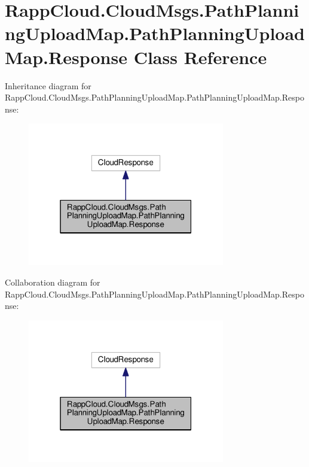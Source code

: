 \hypertarget{classRappCloud_1_1CloudMsgs_1_1PathPlanningUploadMap_1_1PathPlanningUploadMap_1_1Response}{\section{Rapp\-Cloud.\-Cloud\-Msgs.\-Path\-Planning\-Upload\-Map.\-Path\-Planning\-Upload\-Map.\-Response Class Reference}
\label{classRappCloud_1_1CloudMsgs_1_1PathPlanningUploadMap_1_1PathPlanningUploadMap_1_1Response}
}


Inheritance diagram for Rapp\-Cloud.\-Cloud\-Msgs.\-Path\-Planning\-Upload\-Map.\-Path\-Planning\-Upload\-Map.\-Response\-:
\nopagebreak
\begin{figure}[H]
\begin{center}
\leavevmode
\includegraphics[width=244pt]{classRappCloud_1_1CloudMsgs_1_1PathPlanningUploadMap_1_1PathPlanningUploadMap_1_1Response__inherit__graph}
\end{center}
\end{figure}


Collaboration diagram for Rapp\-Cloud.\-Cloud\-Msgs.\-Path\-Planning\-Upload\-Map.\-Path\-Planning\-Upload\-Map.\-Response\-:
\nopagebreak
\begin{figure}[H]
\begin{center}
\leavevmode
\includegraphics[width=244pt]{classRappCloud_1_1CloudMsgs_1_1PathPlanningUploadMap_1_1PathPlanningUploadMap_1_1Response__coll__graph}
\end{center}
\end{figure}
